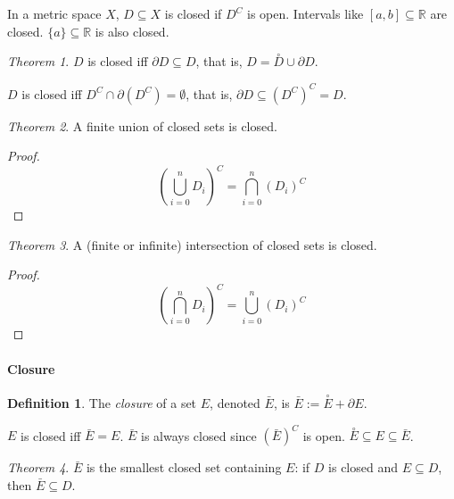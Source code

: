 \documentclass[12pt,a4paper]{report}
\numberwithin{equation}{section}
\theoremstyle{definition}
\newtheorem{definition}{Definition}[section]
\theoremstyle{remark}
\newtheorem{theorem}{Theorem}[section]
\begin{document}
In a metric space $X$, $D\subseteq X$ is closed if $D^C$ is open. Intervals like $[a, b] \subseteq \mathbb{R}$ are closed. $\lbrace a \rbrace \subseteq \mathbb{R}$ is also closed.

\begin{theorem}
$D$ is closed iff $\partial D \subseteq D$, that is, $D = \overset{\circ}{D} \cup \partial D$.

$D$ is closed iff $D^C \cap \partial (D^C) = \emptyset$, that is, $\partial D \subseteq (D^C)^C = D$.
\end{theorem}

\begin{theorem}
A finite union of closed sets is closed.
\end{theorem}

\begin{proof}
\begin{equation}
\left( 
\bigcup_{i=0}^n D_i
\right)^C
=\bigcap_{i=0}^n
\left(
D_i
\right)^C
\end{equation}
\end{proof}

\begin{theorem}
A (finite or infinite) intersection of closed sets is closed.
\end{theorem}

\begin{proof}
\begin{equation}
\left( 
\bigcap_{i=0}^n D_i
\right)^C
=\bigcup_{i=0}^n
\left(
D_i
\right)^C
\end{equation}
\end{proof}

\paragraph{Closure}

\begin{definition}
The \emph{closure} of a set $E$, denoted $\bar{E}$, is $\bar{E}:= \overset{\circ}{E} + \partial E$.
\end{definition}

$E$ is closed iff $\bar{E} = E$. $\bar{E}$ is always closed since $(\bar{E})^C$ is open. $\overset{\circ}{E} \subseteq E \subseteq \bar{E}$.

\begin{theorem}
$\bar{E}$ is the smallest closed set containing $E$: if $D$ is closed and $E \subseteq D$, then $\bar{E}\subseteq D$.
\end{theorem}
\end{document}
